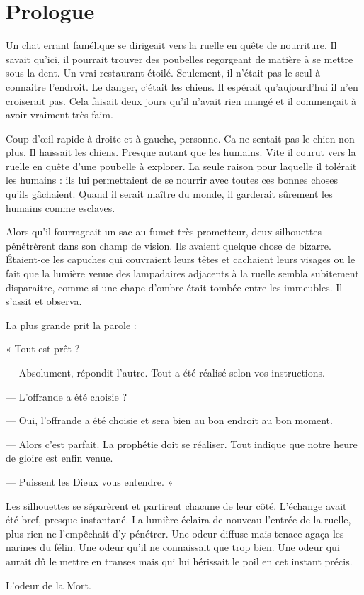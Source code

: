 \chapter{Prologue}
Un chat errant famélique se dirigeait vers la ruelle en quête de nourriture. Il savait qu'ici, il pourrait trouver des 
poubelles regorgeant de matière à se mettre sous la dent. Un vrai restaurant étoilé. Seulement, il n'était pas le 
seul à connaitre l'endroit. Le danger, c'était les chiens. Il espérait qu'aujourd'hui il n'en croiserait pas. Cela 
faisait deux jours qu'il n'avait rien mangé et il commençait à avoir vraiment très faim.

Coup d'œil rapide à droite et à gauche, personne. Ca ne sentait pas le chien non plus. Il haïssait les chiens. 
Presque autant que les humains. Vite il courut  vers la ruelle en quête d'une poubelle à explorer. La seule raison 
pour laquelle il tolérait les humains : ils lui permettaient de se nourrir avec toutes ces bonnes choses qu'ils 
gâchaient. Quand il serait maître du monde, il garderait sûrement les humains comme esclaves. 

Alors qu'il fourrageait un sac au fumet très prometteur, deux silhouettes pénétrèrent dans son champ de vision. Ils 
avaient quelque chose de bizarre. Étaient-ce les capuches qui couvraient leurs têtes et cachaient leurs visages ou
 le fait que la lumière venue des lampadaires adjacents à la ruelle sembla subitement disparaitre, comme si une chape 
d'ombre était tombée entre les immeubles. Il s'assit et observa.

La plus grande prit la parole :

« Tout est prêt ?

— Absolument, répondit l'autre. Tout a été réalisé selon vos instructions.

— L'offrande a été choisie ?

— Oui, l'offrande a été choisie et sera bien au bon endroit au bon moment. 

— Alors c'est parfait. La prophétie doit se réaliser. Tout indique que notre heure de gloire est enfin venue. 

— Puissent les Dieux vous entendre. »

Les silhouettes se séparèrent et partirent chacune de leur côté. L'échange avait été bref, presque instantané. La 
lumière éclaira de nouveau l'entrée de la ruelle, plus rien ne l'empêchait d'y pénétrer. Une odeur diffuse mais tenace 
agaça les narines du félin. Une odeur qu'il ne connaissait que trop bien. Une odeur qui aurait dû le mettre en transes 
mais qui lui hérissait le poil en cet instant précis.

L'odeur de la Mort.